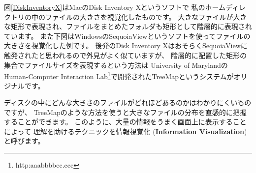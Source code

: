 \documentclass[a5j,openany,papersize,oneside]{tbook}
\begin{document}
図\ref{DiskInventoryX}はMacのDisk Inventory Xというソフトで
私のホームディレクトリの中のファイルの大きさを視覚化したものです。
大きなファイルが大きな矩形で表現され、ファイルをまとめたフォルダも矩形として階層的に表現されています。
また下図はWindowsのSequoiaViewというソフトを使ってファイルの大きさを視覚化した例です。
後発のDisk Inventory XはおそらくSequoiaViewに触発されたと思われるので外見がよく似ていますが、
階層的に配置した矩形の集合でファイルサイズを表現するという方法は
University of MarylandのHuman-Computer Interaction Lab\footnote{
  \textsf{http:aaabbbbcc.ccc}
}で開発されたTreeMapというシステムがオリジナルです。



ディスクの中にどんな大きさのファイルがどれほどあるのかはわかりにくいものですが、
TreeMapのような方法を使うと大きなファイルの分布を直感的に把握することができます。
このように、大量の情報をうまく画面上に表示することによって
理解を助けるテクニックを情報視覚化 (\textbf{Information Visualization})と呼びます。




\backmatter

% 
\printindex
\end{document}
